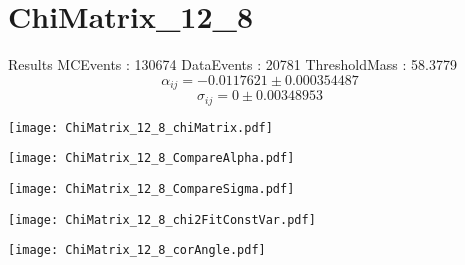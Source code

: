 \documentclass[a4paper,12pt]{article}
\begin{document}
\section{ChiMatrix\_12\_8}
\begin{minipage}{0.49\linewidth} Results \newline
MCEvents : 130674\newline
DataEvents : 20781 \newline
ThresholdMass : 58.3779\\
$$\alpha_{ij} = -0.0117621\pm 0.000354487$$
$$\sigma_{ij} = 0\pm 0.00348953$$
\end{minipage}\hfill
\begin{minipage}{0.49\linewidth} 
\texttt{[image: ChiMatrix\_12\_8\_chiMatrix.pdf]}\\
\end{minipage}
\hfill
\begin{minipage}{0.49\linewidth} 
\texttt{[image: ChiMatrix\_12\_8\_CompareAlpha.pdf]}\\
\end{minipage}
\hfill
\begin{minipage}{0.49\linewidth} 
\texttt{[image: ChiMatrix\_12\_8\_CompareSigma.pdf]}\\
\end{minipage}
\begin{minipage}{0.49\linewidth} 
\texttt{[image: ChiMatrix\_12\_8\_chi2FitConstVar.pdf]}\\
\end{minipage}
\hfill
\begin{minipage}{0.49\linewidth} 
\texttt{[image: ChiMatrix\_12\_8\_corAngle.pdf]}\\
\end{minipage}
\end{document}
